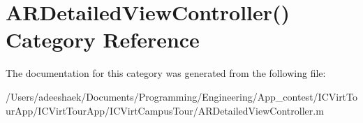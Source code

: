 \hypertarget{category_a_r_detailed_view_controller_07_08}{\section{A\-R\-Detailed\-View\-Controller() Category Reference}
\label{category_a_r_detailed_view_controller_07_08}
}


The documentation for this category was generated from the following file\-:\begin{DoxyCompactItemize}
\item 
/\-Users/adeeshaek/\-Documents/\-Programming/\-Engineering/\-App\-\_\-contest/\-I\-C\-Virt\-Tour\-App/\-I\-C\-Virt\-Tour\-App/\-I\-C\-Virt\-Campus\-Tour/A\-R\-Detailed\-View\-Controller.\-m\end{DoxyCompactItemize}
